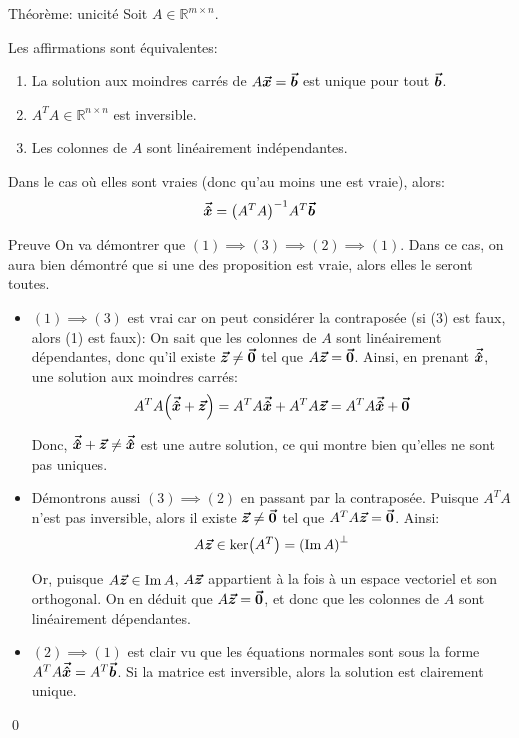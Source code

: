 \documentclass[a4paper]{article}
\begin{document}
\begin{parag}{Théorème: unicité}
    Soit $A \in \mathbb{R}^{m \times n}$.

    Les affirmations sont équivalentes:
    \begin{enumerate}
        \item La solution aux moindres carrés de $A \bm{\protect\vec{x}} = \bm{\protect\vec{b}}$ est unique pour tout $\bm{\protect\vec{b}}$.
        \item $A^T A \in \mathbb{R}^{n \times n}$ est inversible.
        \item Les colonnes de $A$ sont linéairement indépendantes.
    \end{enumerate}

    Dans le cas où elles sont vraies (donc qu'au moins une est vraie), alors:
    \[\bvec{\hat{x}} = \left(A^T A\right)^{-1} A^T \bvec{b}\]

    \begin{subparag}{Preuve}
        On va démontrer que $\left(1\right) \implies \left(3\right) \implies \left(2\right) \implies \left(1\right)$. Dans ce cas, on aura bien démontré que si une des proposition est vraie, alors elles le seront toutes.

        \begin{itemize}[left=0pt]
            \item $\left(1\right) \implies \left(3\right)$ est vrai car on peut considérer la contraposée (si (3) est faux, alors (1) est faux): On sait que les colonnes de $A$ sont linéairement dépendantes, donc qu'il existe $\bm{\protect\vec{z}} \neq \bm{\protect\vec{0}}$ tel que $A \bm{\protect\vec{z}} = \bm{\protect\vec{0}}$. Ainsi, en prenant $\bm{\protect\vec{\hat{x}}}$, une solution aux moindres carrés:
            \[A^T A \left(\bvec{\hat{x}} + \bvec{z}\right) = A^T A \bvec{\hat{x}} + A^T A \bvec{z} = A^T A \bvec{\hat{x}} + \bvec{0}\]

            Donc, $\bm{\protect\vec{\hat{x}}} + \bm{\protect\vec{z}} \neq \bm{\protect\vec{\hat{x}}}$ est une autre solution, ce qui montre bien qu'elles ne sont pas uniques.


        \item Démontrons aussi $\left(3\right) \implies \left(2\right)$ en passant par la contraposée. Puisque $A^T A$ n'est pas inversible, alors il existe $\bm{\protect\vec{z}} \neq \bm{\protect\vec{0}}$ tel que $A^T A \bm{\protect\vec{z}} = \bm{\protect\vec{0}}$. Ainsi:
            \[A \bvec{z} \in \ker\left(A^T\right) = \left(\im A\right)^\perp\]

            Or, puisque $A \bm{\protect\vec{z}} \in \operatorname{Im} A$, $A \bm{\protect\vec{z}}$ appartient à la fois à un espace vectoriel et son orthogonal. On en déduit que $A \bm{\protect\vec{z}} = \bm{\protect\vec{0}}$, et donc que les colonnes de $A$ sont linéairement dépendantes.

        \item $\left(2\right) \implies \left(1\right)$ est clair vu que les équations normales sont sous la forme $A^T A \bm{\protect\vec{\hat{x}}} = A^T \bm{\protect\vec{b}}$. Si la matrice est inversible, alors la solution est clairement unique.
        \end{itemize}

        \qed
    \end{subparag}
\end{parag}
\end{document}
